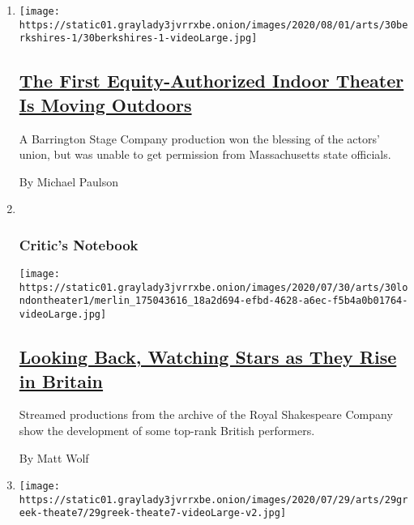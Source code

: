 \begin{enumerate}
\def\labelenumi{\arabic{enumi}.}
\item
  \texttt{[image: https://static01.graylady3jvrrxbe.onion/images/2020/08/01/arts/30berkshires-1/30berkshires-1-videoLarge.jpg]}

  \hypertarget{the-first-equity-authorized-indoor-theater-is-moving-outdoors}{%
  \subsection{\texorpdfstring{\href{/2020/07/30/theater/the-first-equity-authorized-indoor-theater-is-moving-outdoors.html}{The
  First Equity-Authorized Indoor Theater Is Moving
  Outdoors}}{The First Equity-Authorized Indoor Theater Is Moving Outdoors}}\label{the-first-equity-authorized-indoor-theater-is-moving-outdoors}}

  A Barrington Stage Company production won the blessing of the actors'
  union, but was unable to get permission from Massachusetts state
  officials.

  By Michael Paulson
\item ~
  \hypertarget{critics-notebook}{%
  \subsubsection{Critic's Notebook}\label{critics-notebook}}

  \texttt{[image: https://static01.graylady3jvrrxbe.onion/images/2020/07/30/arts/30londontheater1/merlin\_175043616\_18a2d694-efbd-4628-a6ec-f5b4a0b01764-videoLarge.jpg]}

  \hypertarget{looking-back-watching-stars-as-they-rise-in-britain}{%
  \subsection{\texorpdfstring{\href{/2020/07/30/theater/patsy-ferran-michelle-terry-lucian-msamati.html}{Looking
  Back, Watching Stars as They Rise in
  Britain}}{Looking Back, Watching Stars as They Rise in Britain}}\label{looking-back-watching-stars-as-they-rise-in-britain}}

  Streamed productions from the archive of the Royal Shakespeare Company
  show the development of some top-rank British performers.

  By Matt Wolf
\item
  \texttt{[image: https://static01.graylady3jvrrxbe.onion/images/2020/07/29/arts/29greek-theate7/29greek-theate7-videoLarge-v2.jpg]}


\end{enumerate}
